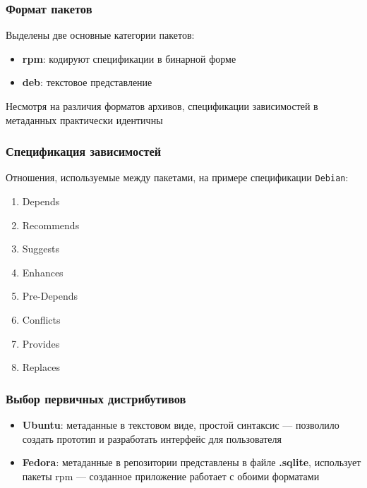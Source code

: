 \documentclass{beamer}
\begin{document}
\begin{frame}
	\frametitle{Формат пакетов}
	Выделены две основные категории пакетов:
	\begin{itemize}
		\item \textbf{rpm}: кодируют спецификации в бинарной форме
		\item \textbf{deb}: текстовое представление
	\end{itemize}

	Несмотря на различия форматов архивов, спецификации зависимостей в метаданных практически идентичны
\end{frame}

\begin{frame}
	\frametitle{Спецификация зависимостей}
	Отношения, используемые между пакетами, на примере спецификации \texttt{Debian}:
	\begin{enumerate}
		\item Depends
		\item Recommends
		\item Suggests
		\item Enhances
		\item Pre-Depends
		\item Conflicts
		\item Provides
		\item Replaces
	\end{enumerate}
\end{frame}

\begin{frame}
	\frametitle{Выбор первичных дистрибутивов}
	\begin{itemize}
		\item \textbf{Ubuntu}: метаданные в текстовом виде, простой синтаксис --- позволило создать прототип и разработать интерфейс для пользователя
		\item \textbf{Fedora}: метаданные в репозитории представлены в файле \textbf{.sqlite}, использует пакеты rpm --- созданное приложение работает с обоими форматами
	\end{itemize}
\end{frame}
\end{document}
